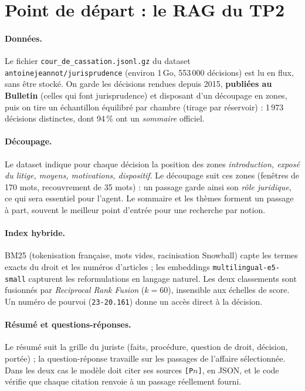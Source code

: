 \documentclass[11pt,a4paper]{article}
\begin{document}
\section{Point de départ : le RAG du TP2}

\paragraph{Données.} Le fichier \texttt{cour\_de\_cassation.jsonl.gz} du dataset
\texttt{antoinejeannot/jurisprudence} (environ 1\,Go, 553\,000 décisions) est lu en flux, sans être
stocké. On garde les décisions rendues depuis 2015, \textbf{publiées au Bulletin} (celles qui font
jurisprudence) et disposant d'un découpage en zones, puis on tire un échantillon équilibré par chambre
(tirage par réservoir) : 1\,973 décisions distinctes, dont 94\,\% ont un \emph{sommaire} officiel.

\paragraph{Découpage.} Le dataset indique pour chaque décision la position des zones
\emph{introduction, exposé du litige, moyens, motivations, dispositif}. Le découpage suit ces zones
(fenêtres de 170 mots, recouvrement de 35 mots) : un passage garde ainsi son \emph{rôle juridique},
ce qui sera essentiel pour l'agent. Le sommaire et les thèmes forment un passage à part, souvent le
meilleur point d'entrée pour une recherche par notion.

\paragraph{Index hybride.} BM25 (tokenisation française, mots vides, racinisation Snowball) capte les
termes exacts du droit et les numéros d'articles ; les embeddings \texttt{multilingual-e5-small}
capturent les reformulations en langage naturel. Les deux classements sont fusionnés par
\emph{Reciprocal Rank Fusion} ($k=60$), insensible aux échelles de score. Un numéro de pourvoi
(\texttt{23-20.161}) donne un accès direct à la décision.

\paragraph{Résumé et questions-réponses.} Le résumé suit la grille du juriste (faits, procédure,
question de droit, décision, portée) ; la question-réponse travaille sur les passages de l'affaire
sélectionnée. Dans les deux cas le modèle doit citer ses sources \texttt{[P$n$]}, en JSON, et le code
vérifie que chaque citation renvoie à un passage réellement fourni.
\end{document}
